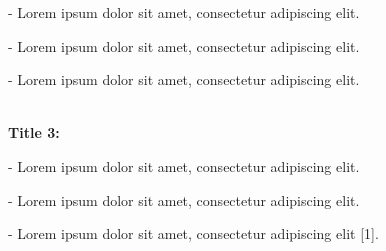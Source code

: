 \documentclass[a1paper,portrait,fontscale=0.410]{baposter}
\begin{document}
\begin{poster}
{- Lorem ipsum dolor sit amet, consectetur adipiscing elit.

- Lorem ipsum dolor sit amet, consectetur adipiscing elit.

- Lorem ipsum dolor sit amet, consectetur adipiscing elit.

\textbf{\\Title 3:}

- Lorem ipsum dolor sit amet, consectetur adipiscing elit.

- Lorem ipsum dolor sit amet, consectetur adipiscing elit.

- Lorem ipsum dolor sit amet, consectetur adipiscing elit [1].

}










\end{poster}
\end{document}
